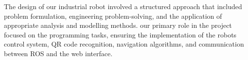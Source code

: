 \documentclass[../../main]{subfiles}
\begin{document}









%  

The design of our industrial robot involved a structured approach that
included problem formulation, engineering problem-solving, and the
application of appropriate analysis and modelling methods. our primary
role in the project focused on the programming tasks, ensuring the
implementation of the robot\textquotesingle s control system, QR code
recognition, navigation algorithms, and communication between ROS and
the web interface.
\end{document}

